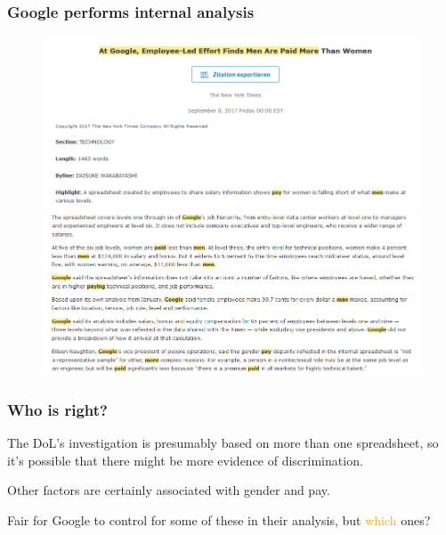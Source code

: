 \documentclass[12pt,english,dvipsnames,aspectratio=169,handout]{beamer}
\begin{document}
\begin{frame}
	\frametitle{Google performs internal analysis}
	
	\begin{figure}
		\centering
		\includegraphics[scale=0.3]{../04-figures/04/04-03}
    	\includegraphics[scale=0.3]{../04-figures/04/04-04}
	\end{figure}
\end{frame}


\begin{frame}
	\frametitle{Who is right?}
	\begin{figure}
		\centering
		\scriptsize
	\end{figure}
	
	
	The DoL's investigation is presumably based on more than one spreadsheet, so it's possible that there might be more evidence of discrimination.\bigskip
	
	\pause
	
	Other factors are certainly associated with gender and pay.\bigskip
	
	\pause
	
	Fair for Google to control for some of these in their analysis, but \textcolor{orange}{which} ones?
	
\end{frame}
\end{document}
